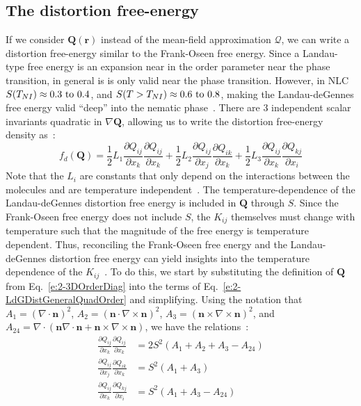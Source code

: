 \subsection{The distortion free-energy}
If we consider $\mathbf{Q}(\mathbf{r})$ instead of the mean-field approximation $\bm{\mathcal{Q}}$, we can write a distortion free-energy similar to the Frank-Oseen free energy.
Since a Landau-type free energy is an expansion near in the order parameter near the phase transition, in general is is only valid near the phase transition.
However, in NLC $S(T_{NI}) \approx 0.3 \textup{ to } 0.4$, and $S(T > T_{NI}) \approx 0.6 \textup{ to } 0.8$, making the Landau-deGennes free energy valid ``deep'' into the nematic phase~\cite{RN198}.
There are 3 independent scalar invariants quadratic in $\nabla\mathbf{Q}$, allowing us to write the distortion free-energy density as~\cite{RN189,RN198}:
\begin{equation}
  f_d(\mathbf{Q}) = \frac{1}{2} L_1 \frac{\partial Q_{ij}}{\partial x_k} \frac{\partial Q_{ij}}{\partial x_k}
    + \frac{1}{2} L_2 \frac{\partial Q_{ij}}{\partial x_j} \frac{\partial Q_{ik}}{\partial x_k}
    + \frac{1}{2} L_3 \frac{\partial Q_{ij}}{\partial x_k} \frac{\partial Q_{kj}}{\partial x_i}\label{e:2-LdGDistGeneralQuadOrder}
\end{equation}
Note that the $L_i$ are constants that only depend on the interactions between the molecules and are temperature independent~\cite{RN198}.
The temperature-dependence of the Landau-deGennes distortion free energy is included in $\mathbf{Q}$ through $S$.
Since the Frank-Oseen free energy does not include $S$, the $K_{ij}$ themselves must change with temperature such that the magnitude  of the free energy is temperature dependent.
Thus, reconciling the Frank-Oseen free energy and the Landau-deGennes distortion free energy can yield insights into the temperature dependence of the $K_{ij}$~\cite{RN189,RN198}.
To do this, we start by substituting the definition of $\mathbf{Q}$ from Eq.~\ref{e:2-3DOrderDiag} into the terms of Eq.~\ref{e:2-LdGDistGeneralQuadOrder} and simplifying. Using the notation that
    $A_1 = (\nabla \cdot \mathbf{n})^2$,
    $A_2 = (\mathbf{n} \cdot \nabla \times \mathbf{n})^2$,
    $A_3 = (\mathbf{n} \times \nabla \times \mathbf{n})^2$, and
    $A_{24} = \nabla \cdot (\mathbf{n} \nabla \cdot \mathbf{n} + \mathbf{n} \times \nabla \times \mathbf{n})$, we have the relations~\cite{RN189,RN198}:
\label{e:2-LdGRelationsQuadOrder}
\begin{align}
  \frac{\partial Q_{ij}}{\partial x_k} \frac{\partial Q_{ij}}{\partial x_k} & =
    2 S^2(A_1 + A_2 + A_3 -A_{24})\tag{\theequation a} \\
  \frac{\partial Q_{ij}}{\partial x_j} \frac{\partial Q_{ik}}{\partial x_k} &=
    S^2 (A_1 + A_3)\tag{\theequation b}\\
  \frac{\partial Q_{ij}}{\partial x_k} \frac{\partial Q_{kj}}{\partial x_i} &=
    S^2 (A_1 + A_3 - A_{24})\tag{\theequation b}
\end{align}
